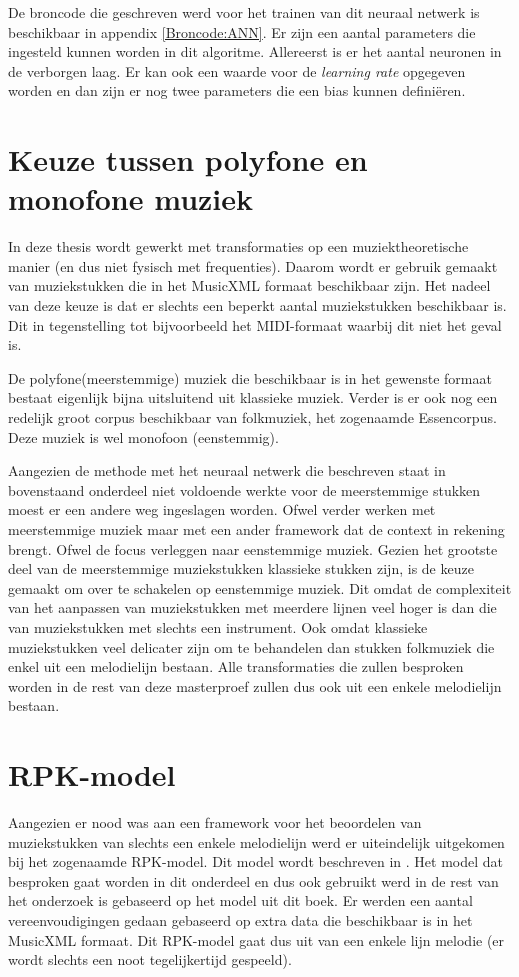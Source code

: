 De broncode die geschreven werd voor het trainen van dit neuraal netwerk is beschikbaar in appendix \ref{Broncode:ANN}. Er zijn een aantal parameters die ingesteld kunnen worden in dit algoritme. Allereerst is er het aantal neuronen in de verborgen laag. Er kan ook een waarde voor de \textit{learning rate} opgegeven worden en dan zijn er nog twee parameters die een bias kunnen defini\"eren.

\section{Keuze tussen polyfone en monofone muziek}
\label{OBM:OMM}
In deze thesis wordt gewerkt met transformaties op een muziektheoretische manier (en dus niet fysisch met frequenties). Daarom wordt er gebruik gemaakt van muziekstukken die in het MusicXML\cite{url:musicxml} formaat beschikbaar zijn. Het nadeel van deze keuze is dat er slechts een beperkt aantal muziekstukken beschikbaar is. Dit in tegenstelling tot bijvoorbeeld het MIDI-formaat\cite{url:midi} waarbij dit niet het geval is. 

De polyfone(meerstemmige) muziek die beschikbaar is in het gewenste formaat bestaat eigenlijk bijna uitsluitend uit klassieke muziek. Verder is er ook nog een redelijk groot corpus beschikbaar van folkmuziek, het zogenaamde Essencorpus\cite{url:essen}. Deze muziek is wel monofoon (eenstemmig).

Aangezien de methode met het neuraal netwerk die beschreven staat in bovenstaand onderdeel niet voldoende werkte voor de meerstemmige stukken moest er een andere weg ingeslagen worden. Ofwel verder werken met meerstemmige muziek maar met een ander framework dat de context in rekening brengt. Ofwel de focus verleggen naar eenstemmige muziek. Gezien het grootste deel van de meerstemmige muziekstukken klassieke stukken zijn, is de keuze gemaakt om over te schakelen op eenstemmige muziek. Dit omdat de complexiteit van het aanpassen van muziekstukken met meerdere lijnen veel hoger is dan die van muziekstukken met slechts een instrument. Ook omdat klassieke muziekstukken veel delicater zijn om te behandelen dan stukken folkmuziek die enkel uit een melodielijn bestaan. Alle transformaties die zullen besproken worden in de rest van deze masterproef zullen dus ook uit een enkele melodielijn bestaan.

\section{RPK-model}
\label{OBM:RPK}
Aangezien er nood was aan een framework voor het beoordelen van muziekstukken van slechts een enkele melodielijn werd er uiteindelijk uitgekomen bij het zogenaamde RPK-model. Dit model wordt beschreven in \cite{book:musicAndProbability}. Het model dat besproken gaat worden in dit onderdeel en dus ook gebruikt werd in de rest van het onderzoek is gebaseerd op het model uit dit boek. Er werden een aantal vereenvoudigingen gedaan gebaseerd op extra data die beschikbaar is in het MusicXML formaat. Dit RPK-model gaat dus uit van een enkele lijn melodie (er wordt slechts een noot tegelijkertijd gespeeld). 

